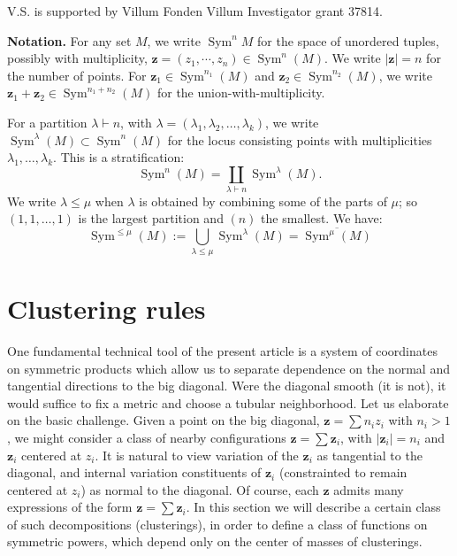 \documentclass{article}
\DeclareMathOperator{\Sym}{Sym}
\theoremstyle{definition}
\begin{document}
        V.S. is supported by  Villum Fonden Villum Investigator grant 37814.




\vspace{2mm} \noindent
{\bf Notation.}
For any set $M$, we write $\Sym^n M$ for the space of unordered tuples, possibly with multiplicity,   
$\mathbf{z} = (z_1, \cdots, z_n)  \in \Sym^n(M)$.  We write $|\mathbf{z}|=n$ for the number of points.  For $\mathbf{z}_1 \in \Sym^{n_1}(M)$ and $\mathbf{z}_2 \in \Sym^{n_2}(M)$, we write $\mathbf{z}_1 + \mathbf{z}_2 \in \Sym^{n_1+n_2}(M)$ for the  union-with-multiplicity.


For a partition $\lambda \vdash n$, with $\lambda = (\lambda_1, \lambda_2, \ldots, \lambda_k)$,  we write $\Sym^\lambda(M) \subset \Sym^n(M)$ for the locus consisting points with multiplicities $\lambda_1, \ldots, \lambda_k$.  This is a stratification:  $$\Sym^n(M) = \coprod_{\lambda \vdash n} \Sym^\lambda(M).$$
We write $\lambda \le \mu$ when $\lambda$ is obtained by combining some of the parts of $\mu$; so $(1,1,\ldots,1)$ is the largest partition and $(n)$ the smallest.   We have:
\begin{equation}  \label{partition ordering captures closure} 
\Sym^{\le \mu}(M) := \bigcup_{\lambda \le \mu} \Sym^\lambda(M) = \overline{\Sym^\mu(M)}\end{equation}

\section{Clustering rules}\label{sec: clustering rules}

One fundamental technical tool of the present article is a system of coordinates on symmetric products which allow us to separate dependence on the  normal and tangential directions to the big diagonal.  Were the diagonal smooth (it is not), it would suffice to fix a metric and choose a tubular neighborhood.
Let us elaborate on the basic challenge.  Given a point on the big diagonal, $\mathbf{z} = \sum n_i z_i$ with $n_i > 1$, we might consider a class of nearby configurations 
$\mathbf{z} = \sum \mathbf{z}_i$, with $|\mathbf{z}_i| = n_i$ and $\mathbf{z}_i$ centered at $z_i$.  It is natural to view  variation of the $\mathbf{z}_i$ as tangential to the diagonal, and internal  variation constituents of $\mathbf{z}_i$ (constrainted to remain centered at $z_i$) as normal to the diagonal.  
Of course, each $\mathbf{z}$ admits many expressions of the form
$\mathbf{z} = \sum \mathbf{z}_i$.  In this section we will describe a certain class of such decompositions (clusterings), in order to define a class of functions on symmetric powers, which depend only on the center of masses of clusterings.
\end{document}
